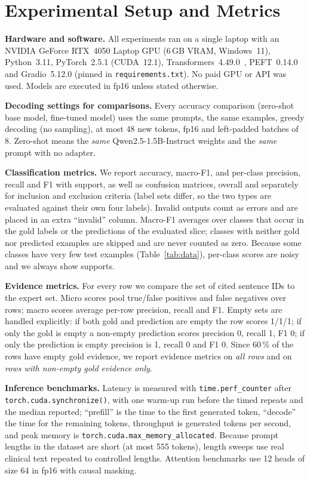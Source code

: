 \section{Experimental Setup and Metrics}
\label{sec:setup}
\textbf{Hardware and software.} All experiments ran on a single laptop with an NVIDIA GeForce RTX~4050 Laptop GPU (6\,GB VRAM, Windows~11), Python~3.11, PyTorch~2.5.1 (CUDA~12.1), Transformers~4.49.0~\cite{wolf2020transformers}, PEFT~0.14.0 and Gradio~5.12.0 (pinned in \texttt{requirements.txt}). No paid GPU or API was used. Models are executed in fp16 unless stated otherwise.

\textbf{Decoding settings for comparisons.} Every accuracy comparison (zero-shot base model, fine-tuned model) uses the same prompts, the same examples, greedy decoding (no sampling), at most 48 new tokens, fp16 and left-padded batches of 8. Zero-shot means the \emph{same} Qwen2.5-1.5B-Instruct weights and the \emph{same} prompt with no adapter.

\textbf{Classification metrics.} We report accuracy, macro-F1, and per-class precision, recall and F1 with support, as well as confusion matrices, overall and separately for inclusion and exclusion criteria (label sets differ, so the two types are evaluated against their own four labels). Invalid outputs count as errors and are placed in an extra ``invalid'' column. Macro-F1 averages over classes that occur in the gold labels or the predictions of the evaluated slice; classes with neither gold nor predicted examples are skipped and are never counted as zero. Because some classes have very few test examples (Table~\ref{tab:data}), per-class scores are noisy and we always show supports.

\textbf{Evidence metrics.} For every row we compare the set of cited sentence IDs to the expert set. Micro scores pool true/false positives and false negatives over rows; macro scores average per-row precision, recall and F1. Empty sets are handled explicitly: if both gold and prediction are empty the row scores 1/1/1; if only the gold is empty a non-empty prediction scores precision 0, recall 1, F1 0; if only the prediction is empty precision is 1, recall 0 and F1 0. Since 60\,\% of the rows have empty gold evidence, we report evidence metrics on \emph{all rows} and on \emph{rows with non-empty gold evidence only}.

\textbf{Inference benchmarks.} Latency is measured with \texttt{time.perf\_counter} after \texttt{torch.cuda.synchronize()}, with one warm-up run before the timed repeats and the median reported; ``prefill'' is the time to the first generated token, ``decode'' the time for the remaining tokens, throughput is generated tokens per second, and peak memory is \texttt{torch.cuda.max\_memory\_allocated}. Because prompt lengths in the dataset are short (at most 555 tokens), length sweeps use real clinical text repeated to controlled lengths. Attention benchmarks use 12 heads of size 64 in fp16 with causal masking.
